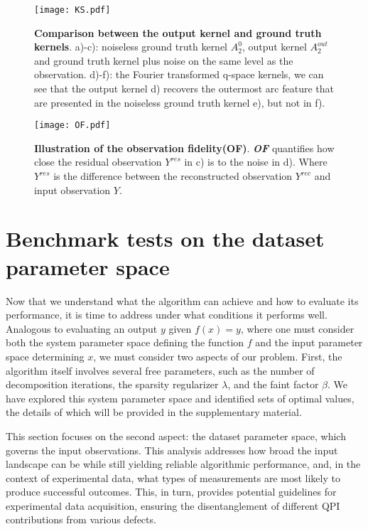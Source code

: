 \begin{figure}
	\texttt{[image: KS.pdf]} 
	\centering
	\caption[\textbf{Comparison between the output kernel and ground truth kernels}]{\textbf{Comparison between the output kernel and ground truth kernels}. a)-c): noiseless ground truth kernel $A_2^0$, output kernel $A_2^{out}$ and ground truth kernel plus noise on the same level as the observation. d)-f): the Fourier transformed q-space kernels, we can see that the output kernel d) recovers the outermost arc feature that are presented in the noiseless ground truth kernel e), but not in f).}
	\label{fig:KS}
\end{figure}

\begin{figure}
	\texttt{[image: OF.pdf]} 
	\centering
	\caption[\textbf{Illustration of the observation fidelity(OF)}]{\textbf{Illustration of the observation fidelity(OF)}. \textbf{\textit{OF}} quantifies how close the residual observation $Y^{res}$ in c) is to the noise in d). Where $Y^{res}$ is the difference between the reconstructed observation $Y^{rec}$ and input observation $Y$.}
	\label{fig:OF}
\end{figure}


\section{Benchmark tests on the dataset parameter space}
Now that we understand what the algorithm can achieve and how to evaluate its performance, it is time to address under what conditions it performs well. Analogous to evaluating an output $y$ given $f(x)=y$, where one must consider both the system parameter space defining the function $f$ and the input parameter space determining $x$, we must consider two aspects of our problem. First, the algorithm itself involves several free parameters, such as the number of decomposition iterations, the sparsity regularizer $\lambda$, and the faint factor $\beta$. We have explored this system parameter space and identified sets of optimal values, the details of which will be provided in the supplementary material.

This section focuses on the second aspect: the dataset parameter space, which governs the input observations. This analysis addresses how broad the input landscape can be while still yielding reliable algorithmic performance, and, in the context of experimental data, what types of measurements are most likely to produce successful outcomes. This, in turn, provides potential guidelines for experimental data acquisition, ensuring the disentanglement of different \ac{QPI} contributions from various defects.

